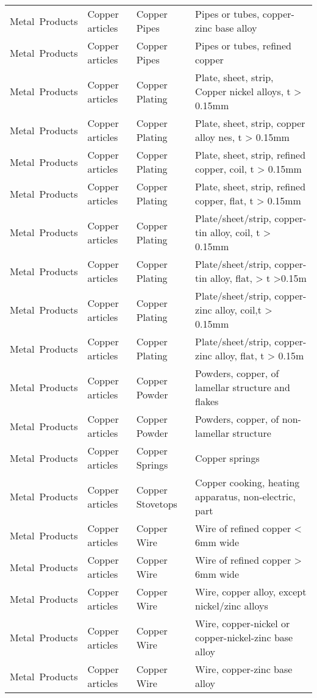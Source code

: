 \begin{appendices}
\begin{xltabular}{\textwidth}{|p{0.10\textwidth}|p{0.25\textwidth}|p{0.20\textwidth}|p{0.35\textwidth}|}
		Metal\ Products & Copper articles & Copper Pipes & Pipes or tubes, copper-zinc base alloy \\
		Metal\ Products & Copper articles & Copper Pipes & Pipes or tubes, refined copper \\
		Metal\ Products & Copper articles & Copper Plating & Plate, sheet, strip, Copper nickel alloys, t > 0.15mm \\
		Metal\ Products & Copper articles & Copper Plating & Plate, sheet, strip, copper alloy nes, t > 0.15mm \\
		Metal\ Products & Copper articles & Copper Plating & Plate, sheet, strip, refined copper, coil, t > 0.15mm \\
		Metal\ Products & Copper articles & Copper Plating & Plate, sheet, strip, refined copper, flat, t > 0.15mm \\
		Metal\ Products & Copper articles & Copper Plating & Plate/sheet/strip, copper-tin alloy, coil, t > 0.15mm \\
		Metal\ Products & Copper articles & Copper Plating & Plate/sheet/strip, copper-tin alloy, flat, > t >0.15m \\
		Metal\ Products & Copper articles & Copper Plating & Plate/sheet/strip, copper-zinc alloy, coil,t > 0.15mm \\
		Metal\ Products & Copper articles & Copper Plating & Plate/sheet/strip, copper-zinc alloy, flat, t > 0.15m \\
		Metal\ Products & Copper articles & Copper Powder & Powders, copper, of lamellar structure and flakes \\
		Metal\ Products & Copper articles & Copper Powder & Powders, copper, of non-lamellar structure \\
		Metal\ Products & Copper articles & Copper Springs & Copper springs \\
		Metal\ Products & Copper articles & Copper Stovetops & Copper cooking, heating apparatus, non-electric, part \\
		Metal\ Products & Copper articles & Copper Wire & Wire of refined copper < 6mm wide \\
		Metal\ Products & Copper articles & Copper Wire & Wire of refined copper > 6mm wide \\
		Metal\ Products & Copper articles & Copper Wire & Wire, copper alloy, except nickel/zinc alloys \\
		Metal\ Products & Copper articles & Copper Wire & Wire, copper-nickel or copper-nickel-zinc base alloy \\
		Metal\ Products & Copper articles & Copper Wire & Wire, copper-zinc base alloy \\

\end{xltabular}
\end{appendices}
